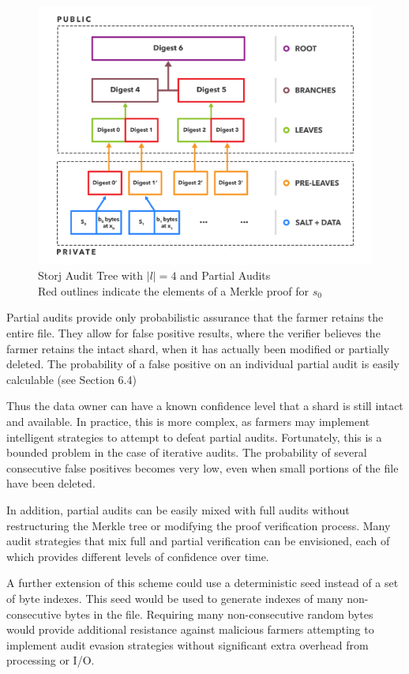 \documentclass[a4paper,10pt]{article}
\begin{document}
\begin{figure}[hbt]
\centering
\includegraphics[width=\linewidth]{3}
\caption{Storj Audit Tree with $ |l| = 4 $ and Partial Audits\\Red outlines indicate the elements of a Merkle proof for $ s_{0} $}
\end{figure}

Partial audits provide only probabilistic assurance that the farmer retains the entire file. They allow for false positive results, where the verifier believes the farmer retains the intact shard, when it has actually been modified or partially deleted. The probability of a false positive on an individual partial audit is easily calculable (see Section 6.4)

Thus the data owner can have a known confidence level that a shard is still intact and available. In practice, this is more complex, as farmers may implement intelligent strategies to attempt to defeat partial audits. Fortunately, this is a bounded problem in the case of iterative audits. The probability of several consecutive false positives becomes very low, even when small portions of the file have been deleted.

In addition, partial audits can be easily mixed with full audits without restructuring the Merkle tree or modifying the proof verification process. Many audit strategies that mix full and partial verification can be envisioned, each of which provides different levels of confidence over time.

A further extension of this scheme could use a deterministic seed instead of a set of byte indexes. This seed would be used to generate indexes of many non-consecutive bytes in the file. Requiring many non-consecutive random bytes would provide additional resistance against malicious farmers attempting to implement audit evasion strategies without significant extra overhead from processing or I/O.
\end{document}

